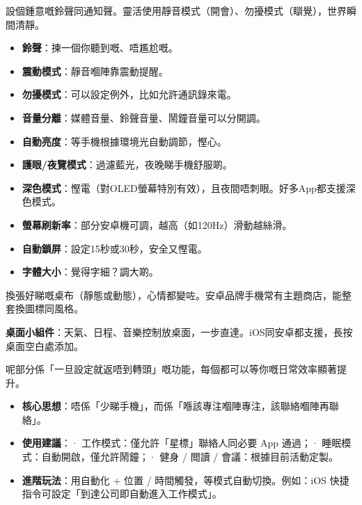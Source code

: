 


設個鍾意嘅鈴聲同通知聲。靈活使用靜音模式（開會）、勿擾模式（瞓覺），世界瞬間清靜。

\begin{itemize}
  \item \textbf{鈴聲}：揀一個你聽到嘅、唔尷尬嘅。
  \item \textbf{震動模式}：靜音嗰陣靠震動提醒。
  \item \textbf{勿擾模式}：可以設定例外，比如允許通訊錄來電。
  \item \textbf{音量分離}：媒體音量、鈴聲音量、鬧鐘音量可以分開調。
\end{itemize}


\begin{itemize}
  \item \textbf{自動亮度}：等手機根據環境光自動調節，慳心。
  \item \textbf{護眼/夜覽模式}：過濾藍光，夜晚睇手機舒服啲。
  \item \textbf{深色模式}：慳電（對OLED螢幕特別有效），且夜間唔刺眼。好多App都支援深色模式。
  \item \textbf{螢幕刷新率}：部分安卓機可調，越高（如120Hz）滑動越絲滑。
  \item \textbf{自動鎖屏}：設定15秒或30秒，安全又慳電。
  \item \textbf{字體大小}：覺得字細？調大啲。
\end{itemize}


換張好睇嘅桌布（靜態或動態），心情都變咗。安卓品牌手機常有主題商店，能整套換圖標同風格。

\textbf{桌面小組件}：天氣、日程、音樂控制放桌面，一步直達。iOS同安卓都支援，長按桌面空白處添加。


呢部分係「一旦設定就返唔到轉頭」嘅功能，每個都可以等你嘅日常效率顯著提升。


\begin{itemize}
  \item \textbf{核心思想}：唔係「少睇手機」，而係「喺該專注嗰陣專注，該聯絡嗰陣再聯絡」。
  \item \textbf{使用建議}：\newline · 工作模式：僅允許「星標」聯絡人同必要 App 通過；\newline · 睡眠模式：自動開啟，僅允許鬧鐘；\newline · 健身 / 閲讀 / 會議：根據目前活動定製。
  \item \textbf{進階玩法}：用自動化 + 位置 / 時間觸發，等模式自動切換。例如：iOS 快捷指令可設定「到達公司即自動進入工作模式」。
\end{itemize}

